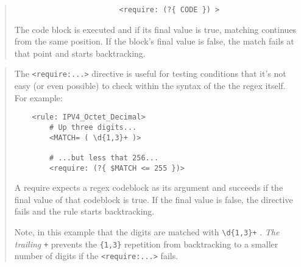 \begin{it}\begin{quotation}
\begin{verbatim}
                        <require: (?{ CODE }) >
\end{verbatim}

The code block is executed and if its final value is true, matching
continues from the same position. If the block's final value is false,
the match fails at that point and starts backtracking.
\end{quotation}\end{it}

\begin{it}\begin{quotation}
The \verb|<require:...>| directive is useful for testing conditions that it's
not easy (or even possible) to check within the syntax of the the regex
itself. For example:

\begin{verbatim}
    <rule: IPV4_Octet_Decimal>
        # Up three digits...
        <MATCH= ( \d{1,3}+ )>
        
        # ...but less that 256...
        <require: (?{ $MATCH <= 255 })>
\end{verbatim}

A require expects a regex codeblock as its argument and succeeds if
the final value of that codeblock is true. If the final value is false,
the directive fails and the rule starts backtracking.

Note, in this example that the digits are matched with \verb|\d{1,3}+| . \emph{The
trailing} \verb|+| prevents the \verb|{1,3}| repetition from backtracking to a smaller
number of digits if the \verb|<require:...>| fails.
\end{quotation}\end{it}

